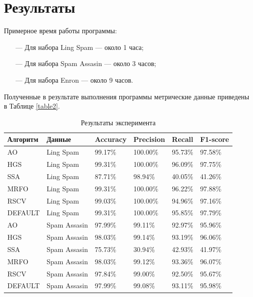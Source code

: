 \section{Результаты}

Примерное время работы программы:
\begin{itemize}
    \item[—] Для набора Ling Spam — около 1 часа;
    \item[—] Для набора Spam Assasin — около 3 часов;
    \item[—] Для набора Enron — около 9 часов.
\end{itemize}

Полученные в результате выполнения программы метрические данные приведены в Таблице \ref{table2}. 

\begin{table}[!ht]
    \centering
    \caption{Результаты эксперимента}
    \begin{tabular}{|p{}|p{}|p{}|p{}|p{}|p{}|}
    \hline
        Алгоритм & Данные & Accuracy & Precision & Recall & F1-score \\ \hline
        AO & Ling Spam & 99.17\% & 100.00\% & 95.73\% & 97.58\% \\ \hline
        HGS & Ling Spam & 99.31\% & 100.00\% & 96.09\% & 97.75\% \\ \hline
        SSA & Ling Spam & 87.71\% & 98.94\% & 40.05\% & 41.26\% \\ \hline
        MRFO & Ling Spam & 99.31\% & 100.00\% & 96.22\% & 97.88\% \\ \hline
        RSCV & Ling Spam & 99.03\% & 100.00\% & 94.96\% & 97.16\% \\ \hline
        DEFAULT & Ling Spam & 99.31\% & 100.00\% & 95.85\% & 97.79\% \\ \hline
        AO & Spam Assasin & 97.99\% & 99.11\% & 92.97\% & 95.96\% \\ \hline
        HGS & Spam Assasin & 98.03\% & 99.14\% & 93.19\% & 96.06\% \\ \hline
        SSA & Spam Assasin & 75.73\% & 30.94\% & 42.93\% & 41.97\% \\ \hline
        MRFO & Spam Assasin & 98.03\% & 99.12\% & 93.36\% & 96.07\% \\ \hline
        RSCV & Spam Assasin & 97.84\% & 99.00\% & 92.50\% & 95.67\% \\ \hline
        DEFAULT & Spam Assasin & 97.99\% & 99.08\% & 93.11\% & 95.98\% \\ \hline

\end{tabular}
\end{table}
